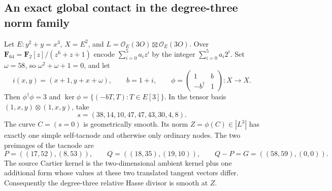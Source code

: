 \subsection{An exact global contact in the degree-three norm family}
\label{subsec:ss-global-contact-witness}

\begin{lemma}
\label{lem:ss-global-contact03}
Let $E:y^2+y=x^3$, $X=E^2$, and
$L=\mathcal O_E(3O)\boxtimes\mathcal O_E(3O)$.
Over $\mathbf F_{64}=\mathbf F_2[z]/(z^6+z+1)$ encode
$\sum_{i=0}^5a_i z^i$ by the integer $\sum_{i=0}^5a_i2^i$.
Set $\omega=58$, so $\omega^2+\omega+1=0$, and let
\[
 i(x,y)=(x+1,y+x+\omega),\qquad b=1+i,\qquad
 \phi=\begin{pmatrix}1&b\\-b^\dagger&1\end{pmatrix}:X\to X.
\]
Then $\phi^\dagger\phi=3$ and $\ker\phi=\{(-bT,T):T\in E[3]\}$.
In the tensor basis $(1,x,y)\otimes(1,x,y)$, take
\[
 s=(38,14,10,47,47,43,30,4,8).
\]
The curve $C=(s=0)$ is geometrically smooth. Its norm
$Z=\phi(C)\in|L^3|$ has exactly one simple self-tacnode and otherwise
only ordinary nodes. The two preimages of the tacnode are
\[
 P=((17,52),(8,53)),\qquad Q=((18,35),(19,10)),
 \qquad Q-P=G=((58,59),(0,0)).
\]
The source Cartier kernel is the two-dimensional ambient kernel plus
one additional form whose values at these two translated tangent
vectors differ. Consequently the degree-three relative Hasse divisor
is smooth at $Z$.
\end{lemma}
